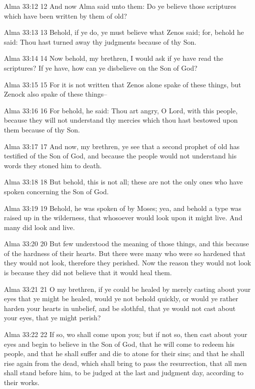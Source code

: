 Alma 33:12
 12 And now Alma said unto them: Do ye believe those scriptures
which have been written by them of old?

Alma 33:13
 13 Behold, if ye do, ye must believe what Zenos said; for,
behold he said: Thou hast turned away thy judgments because of
thy Son.

Alma 33:14
 14 Now behold, my brethren, I would ask if ye have read the
scriptures? If ye have, how can ye disbelieve on the Son of God?

Alma 33:15
 15 For it is not written that Zenos alone spake of these things,
but Zenock also spake of these things--

Alma 33:16
 16 For behold, he said: Thou art angry, O Lord, with this
people, because they will not understand thy mercies which thou
hast bestowed upon them because of thy Son.

Alma 33:17
 17 And now, my brethren, ye see that a second prophet of old has
testified of the Son of God, and because the people would not
understand his words they stoned him to death.

Alma 33:18
 18 But behold, this is not all; these are not the only ones who
have spoken concerning the Son of God.

Alma 33:19
 19 Behold, he was spoken of by Moses; yea, and behold a type was
raised up in the wilderness, that whosoever would look upon it
might live. And many did look and live.

Alma 33:20
 20 But few understood the meaning of those things, and this
because of the hardness of their hearts. But there were many who
were so hardened that they would not look, therefore they
perished. Now the reason they would not look is because they did
not believe that it would heal them.

Alma 33:21
 21 O my brethren, if ye could be healed by merely casting about
your eyes that ye might be healed, would ye not behold quickly,
or would ye rather harden your hearts in unbelief, and be
slothful, that ye would not cast about your eyes, that ye might
perish?

Alma 33:22
 22 If so, wo shall come upon you; but if not so, then cast about
your eyes and begin to believe in the Son of God, that he will
come to redeem his people, and that he shall suffer and die to
atone for their sins; and that he shall rise again from the dead,
which shall bring to pass the resurrection, that all men shall
stand before him, to be judged at the last and judgment day,
according to their works.

